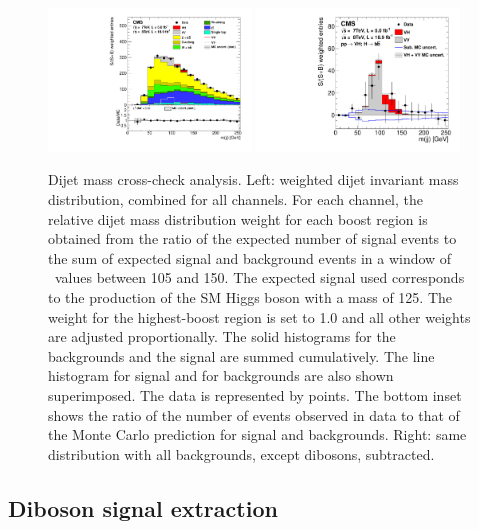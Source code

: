 \documentclass[11pt,twoside,a4paper,cmspaper,final,collab]{cms-tdr}
\begin{document}
\begin{figure}[htbp]
  \begin{center}
   \includegraphics[width=0.48\textwidth]{PRD_MJJ_combined_MJJ}
   \includegraphics[width=0.48\textwidth]{MJJ_subtracted_NewAspectRatio_Sept11}
\caption{Dijet mass cross-check analysis. Left: weighted dijet invariant mass distribution, combined for all
channels. For each channel, the relative dijet mass distribution weight
for each boost region is obtained from the ratio of the expected number of
signal events to the sum of expected signal and background events in a
window of \Mjj\ values between 105 and 150\GeV. The expected signal
used corresponds to the production of the SM Higgs boson with a mass of 125\GeV. The weight for the
highest-boost region is set to 1.0 and all other weights are adjusted
proportionally. The solid histograms for the
backgrounds and the signal are summed cumulatively. The line histogram for
signal and for {\Vvar}{\Vvar} backgrounds are also shown superimposed. The data is
represented by points. The bottom inset shows the ratio of the number of events observed in data to that
of the Monte Carlo prediction for signal and backgrounds. Right: same distribution with all backgrounds, except
dibosons, subtracted.}
    \label{fig:MJJ-combined}
  \end{center}
\end{figure}


\subsection{Diboson signal extraction}
\end{document}
